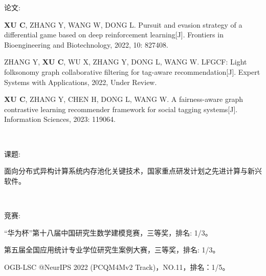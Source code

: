 \newpage
\pagestyle{fancy}
\begin{center}
\heiti{}
\end{center}


论文:

\textbf{XU C}, ZHANG Y, WANG W, DONG L. Pursuit and evasion strategy of a differential game based on deep reinforcement learning[J]. Frontiers in Bioengineering and Biotechnology, 2022, 10: 827408.

ZHANG Y, \textbf{XU C}, WU X, ZHANG Y, DONG L, WANG W. LFGCF: Light folksonomy graph collaborative filtering for tag-aware recommendation[J]. Expert Systems with Applications, 2022, Under Review.

\textbf{XU C}, ZHANG Y, CHEN H, DONG L, WANG W. A fairness-aware graph contrastive learning recommender framework for social tagging systems[J]. Information Sciences, 2023: 119064.

\

课题:

面向分布式异构计算系统内存池化关键技术，国家重点研发计划之先进计算与新兴软件。


\

竞赛:

“华为杯”第十八届中国研究生数学建模竞赛，三等奖，排名: 1/3。

第五届全国应用统计专业学位研究生案例大赛，三等奖，排名: 1/3。

OGB-LSC @NeurIPS 2022 (PCQM4Mv2 Track)，NO.11，排名：1/5。
